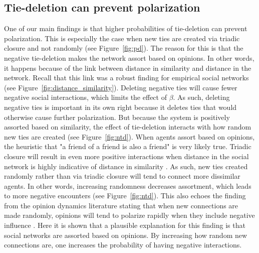 \documentclass[11pt]{article}
\begin{document}
\subsection{Tie-deletion can prevent polarization}
One of our main findings is that higher probabilities of tie-deletion can prevent polarization. This is especially the case when new ties are created via triadic closure and not randomly (see Figure~\ref{fig:pd}). The reason for this is that the negative tie-deletion makes the network assort based on opinions. In other words, it happens because of the link between distance in similarity and distance in the network. Recall that this link was a robust finding for empirical social networks (see Figure~\ref{fig:distance_similarity}). Deleting negative ties will cause fewer negative social interactions, which limits the effect of $\beta$. 
As such, deleting negative ties is important in its own right because it deletes ties that would otherwise cause further polarization. But because the system is positively assorted based on similarity, the effect of tie-deletion interacts with how random new ties are created (see Figure~\ref{fig:ntd}). When agents assort based on opinions, the heuristic that "a friend of a friend is also a friend" is very likely true. Triadic closure will result in even more positive interactions when distance in the social network is highly indicative of distance in similarity \cite{kossinets_origins_2009}. As such, new ties created randomly rather than via triadic closure will tend to connect more dissimilar agents. In other words, increasing randomness decreases assortment, which leads to more negative encounters (see Figure~\ref{fig:ntd}). This also echoes the finding from the opinion dynamics literature stating that when new connections are made randomly, opinions will tend to polarize rapidly when they include negative influence \cite{flache_why_2006,flache_small_2011,turner_paths_2018}. Here it is shown that a plausible explanation for this finding is that social networks are assorted based on opinions. By increasing how random new connections are, one increases the probability of having negative interactions. 
\end{document}
